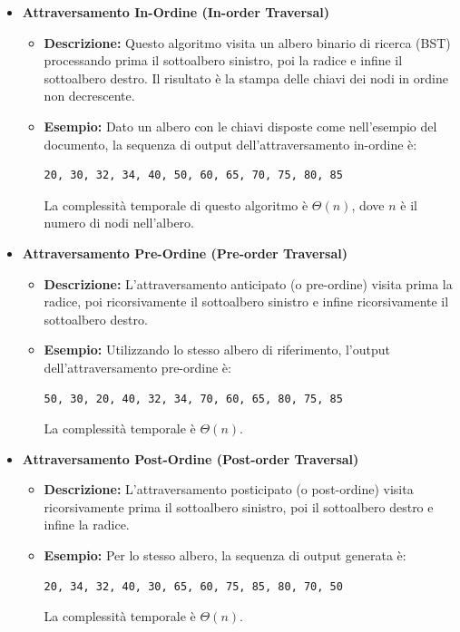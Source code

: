 \begin{itemize}
    \item \textbf{Attraversamento In-Ordine (In-order Traversal)}
    \begin{itemize}
        \item \textbf{Descrizione:} Questo algoritmo visita un albero binario di ricerca (BST) processando prima il sottoalbero sinistro, poi la radice e infine il sottoalbero destro. Il risultato è la stampa delle chiavi dei nodi in ordine non decrescente.

        \item \textbf{Esempio:} Dato un albero con le chiavi disposte come nell'esempio del documento, la sequenza di output dell'attraversamento in-ordine è:
        \begin{verbatim}
20, 30, 32, 34, 40, 50, 60, 65, 70, 75, 80, 85
        \end{verbatim}
        La complessità temporale di questo algoritmo è $\Theta(n)$, dove $n$ è il numero di nodi nell'albero.
    \end{itemize}

    \item \textbf{Attraversamento Pre-Ordine (Pre-order Traversal)}
    \begin{itemize}
        \item \textbf{Descrizione:} L'attraversamento anticipato (o pre-ordine) visita prima la radice, poi ricorsivamente il sottoalbero sinistro e infine ricorsivamente il sottoalbero destro.

        \item \textbf{Esempio:} Utilizzando lo stesso albero di riferimento, l'output dell'attraversamento pre-ordine è:
        \begin{verbatim}
50, 30, 20, 40, 32, 34, 70, 60, 65, 80, 75, 85
        \end{verbatim}
        La complessità temporale è $\Theta(n)$.
    \end{itemize}

    \item \textbf{Attraversamento Post-Ordine (Post-order Traversal)}
    \begin{itemize}
        \item \textbf{Descrizione:} L'attraversamento posticipato (o post-ordine) visita ricorsivamente prima il sottoalbero sinistro, poi il sottoalbero destro e infine la radice.

        \item \textbf{Esempio:} Per lo stesso albero, la sequenza di output generata è:
        \begin{verbatim}
20, 34, 32, 40, 30, 65, 60, 75, 85, 80, 70, 50
        \end{verbatim}
        La complessità temporale è $\Theta(n)$.
    \end{itemize}


\end{itemize}
